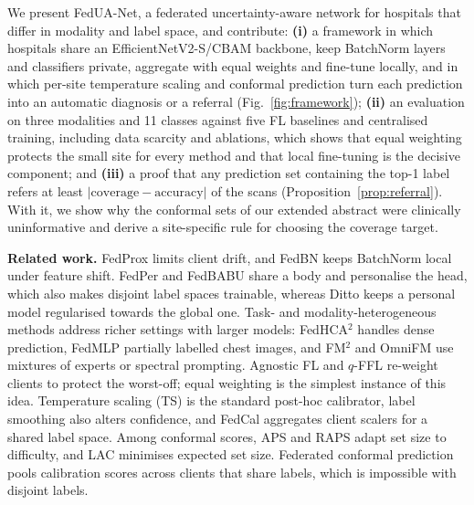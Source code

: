 \documentclass[]{spie}
\begin{document}
We present FedUA-Net, a federated uncertainty-aware network for hospitals that differ in modality and label space, and contribute: \textbf{(i)} a framework in which hospitals share an EfficientNetV2-S/CBAM backbone, keep BatchNorm layers\cite{lixiaoxiao2021fedbn} and classifiers\cite{arivazhagan2019federated} private, aggregate with equal weights and fine-tune locally, and in which per-site temperature scaling and conformal prediction turn each prediction into an automatic diagnosis or a referral (Fig.~\ref{fig:framework}); \textbf{(ii)} an evaluation on three modalities and 11 classes against five FL baselines and centralised training, including data scarcity and ablations, which shows that equal weighting protects the small site for every method and that local fine-tuning is the decisive component; and \textbf{(iii)} a proof that any prediction set containing the top-1 label refers at least $|\text{coverage}-\text{accuracy}|$ of the scans (Proposition~\ref{prop:referral}). With it, we show why the conformal sets of our extended abstract were clinically uninformative and derive a site-specific rule for choosing the coverage target.

\textbf{Related work.} FedProx\cite{litian2020fedprox} limits client drift, and FedBN\cite{lixiaoxiao2021fedbn} keeps BatchNorm local under feature shift. FedPer\cite{arivazhagan2019federated} and FedBABU\cite{oh2022fedbabu} share a body and personalise the head, which also makes disjoint label spaces trainable, whereas Ditto\cite{litian2021ditto} keeps a personal model regularised towards the global one. Task- and modality-heterogeneous methods address richer settings with larger models: FedHCA$^2$\cite{lu2024fedhca2} handles dense prediction, FedMLP\cite{sun2024fedmlp} partially labelled chest images, and FM$^2$\cite{chen2026fm2} and OmniFM\cite{liu2026omnifm} use mixtures of experts or spectral prompting. Agnostic FL\cite{mohri2019agnostic} and $q$-FFL\cite{li2020qffl} re-weight clients to protect the worst-off; equal weighting is the simplest instance of this idea. Temperature scaling (TS)\cite{guo2017calibration} is the standard post-hoc calibrator, label smoothing\cite{muller2019label} also alters confidence, and FedCal\cite{peng2024fedcal} aggregates client scalers for a shared label space. Among conformal scores, APS\cite{romano2020aps} and RAPS\cite{angelopoulos2021raps} adapt set size to difficulty, and LAC\cite{sadinle2019least} minimises expected set size. Federated conformal prediction pools calibration scores across clients that share labels\cite{lu2023federated}, which is impossible with disjoint labels.
\end{document}

